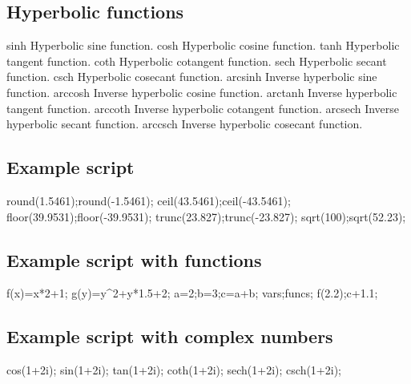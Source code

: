  \hypertarget{command_page_command_hype}{}\subsection{Hyperbolic functions}\label{command_page_command_hype}
\begin{DoxyVerb}sinh        Hyperbolic sine function.
cosh        Hyperbolic cosine function.
tanh        Hyperbolic tangent function.
coth        Hyperbolic cotangent function.
sech        Hyperbolic secant function.
csch        Hyperbolic cosecant function.
arcsinh     Inverse hyperbolic sine function.
arccosh     Inverse hyperbolic cosine function.
arctanh     Inverse hyperbolic tangent function.
arccoth     Inverse hyperbolic cotangent function.
arcsech     Inverse hyperbolic secant function.
arccsch     Inverse hyperbolic cosecant function.
\end{DoxyVerb}
 \hypertarget{command_page_command_exfunc}{}\subsection{Example script}\label{command_page_command_exfunc}
\begin{DoxyVerb}round(1.5461);round(-1.5461);
ceil(43.5461);ceil(-43.5461);
floor(39.9531);floor(-39.9531);
trunc(23.827);trunc(-23.827);
sqrt(100);sqrt(52.23);
\end{DoxyVerb}
 \hypertarget{command_page_command_exuserfunc}{}\subsection{Example script with functions}\label{command_page_command_exuserfunc}
\begin{DoxyVerb}f(x)=x*2+1;
g(y)=y^2+y*1.5+2;
a=2;b=3;c=a+b;
vars;funcs;
f(2.2);c+1.1;
\end{DoxyVerb}
 \hypertarget{command_page_command_excomplex}{}\subsection{Example script with complex numbers}\label{command_page_command_excomplex}
\begin{DoxyVerb}cos(1+2i);
sin(1+2i);
tan(1+2i);
coth(1+2i);
sech(1+2i);
csch(1+2i);
\end{DoxyVerb}
 